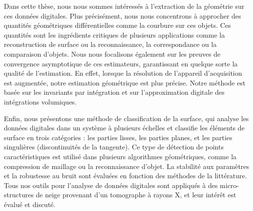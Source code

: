 Dans cette thèse, nous nous sommes intéressés à l'extraction de la géométrie sur
ces données digitales. Plus précisément, nous nous concentrons à approcher des
quantités géométriques différentielles comme la courbure sur ces objets. Ces
quantités sont les ingrédients critiques de plusieurs applications comme la
reconstruction de surface ou la reconnaissance, la correspondance ou la
comparaison d'objets. Nous nous focalisons également sur les preuves de
convergence asymptotique de ces estimateurs, garantissant en quelque sorte la
qualité de l'estimation. En effet, lorsque la résolution de l'appareil
d'acquisition est augmentée, notre estimation géométrique est plus précise.
Notre méthode est basée sur les invariants par intégration et sur
l'approximation digitale des intégrations volumiques.

Enfin, nous présentons une méthode de classification de la surface, qui analyse
les données digitales dans un système à plusieurs échelles et classifie les
éléments de surface en trois catégories : les parties lisses, les parties
planes, et les parties singulières (discontinuités de la tangente). Ce type de
détection de points caractéristiques est utilisé dans plusieurs algorithmes
géométriques, comme la compression de maillage ou la reconnaissance d'objet. La
stabilité aux paramètres et la robustesse au bruit sont évaluées en fonction des
méthodes de la littérature. Tous nos outils pour l'analyse de données digitales
sont appliqués à des micro-structures de neige provenant d'un tomographe à
rayons X, et leur intérêt est évalué et discuté.
